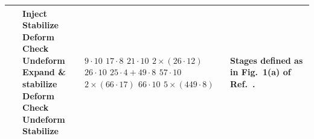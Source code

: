 \documentclass[%
    aps, 
    physrev,
    reprint,
]{revtex4-2}
\begin{document}
\begin{table}
\begin{tabular}{|c|l|l|l|}
    ~\cite{claes2025cultivatingtstatessurface} & 
    \makecell[l]{Inject \\
                Stabilize \\
                Deform \\
                Check \\
                Undeform \\
                Expand \& stabilize \\
                Deform \\
                Check \\
                Undeform \\
                Stabilize
                } &
    \makecell[l]{$9\cdot 10$ \\
                $17 \cdot 8$ \\
                $21 \cdot 10$ \\
                $2\times (26 \cdot 12)$\\
                $26 \cdot 10$ \\
                $25 \cdot 4 + 49 \cdot 8$ \\
                $57 \cdot 10$ \\
                $2\times (66 \cdot 17)$ \\
                $66\cdot 10$ \\
                $5\times (449 \cdot 8)$
                } &
    Stages defined as in Fig.~1(a) of Ref.~\cite{claes2025cultivatingtstatessurface}.\\ \hline  
    

\end{tabular}
\end{table}
\end{document}
